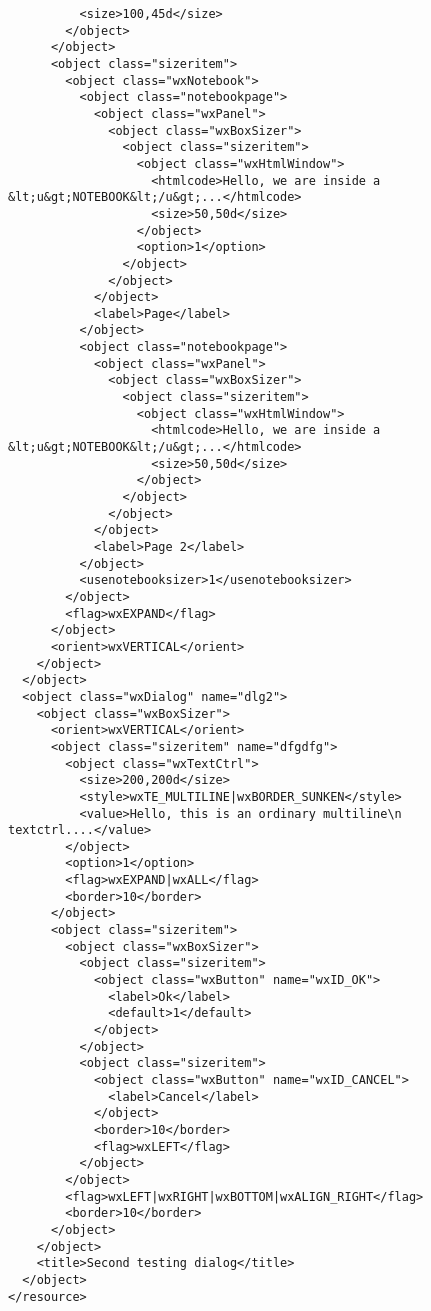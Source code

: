 \begin{verbatim}
          <size>100,45d</size>
        </object>
      </object>
      <object class="sizeritem">
        <object class="wxNotebook">
          <object class="notebookpage">
            <object class="wxPanel">
              <object class="wxBoxSizer">
                <object class="sizeritem">
                  <object class="wxHtmlWindow">
                    <htmlcode>Hello, we are inside a &lt;u&gt;NOTEBOOK&lt;/u&gt;...</htmlcode>
                    <size>50,50d</size>
                  </object>
                  <option>1</option>
                </object>
              </object>
            </object>
            <label>Page</label>
          </object>
          <object class="notebookpage">
            <object class="wxPanel">
              <object class="wxBoxSizer">
                <object class="sizeritem">
                  <object class="wxHtmlWindow">
                    <htmlcode>Hello, we are inside a &lt;u&gt;NOTEBOOK&lt;/u&gt;...</htmlcode>
                    <size>50,50d</size>
                  </object>
                </object>
              </object>
            </object>
            <label>Page 2</label>
          </object>
          <usenotebooksizer>1</usenotebooksizer>
        </object>
        <flag>wxEXPAND</flag>
      </object>
      <orient>wxVERTICAL</orient>
    </object>
  </object>
  <object class="wxDialog" name="dlg2">
    <object class="wxBoxSizer">
      <orient>wxVERTICAL</orient>
      <object class="sizeritem" name="dfgdfg">
        <object class="wxTextCtrl">
          <size>200,200d</size>
          <style>wxTE_MULTILINE|wxBORDER_SUNKEN</style>
          <value>Hello, this is an ordinary multiline\n         textctrl....</value>
        </object>
        <option>1</option>
        <flag>wxEXPAND|wxALL</flag>
        <border>10</border>
      </object>
      <object class="sizeritem">
        <object class="wxBoxSizer">
          <object class="sizeritem">
            <object class="wxButton" name="wxID_OK">
              <label>Ok</label>
              <default>1</default>
            </object>
          </object>
          <object class="sizeritem">
            <object class="wxButton" name="wxID_CANCEL">
              <label>Cancel</label>
            </object>
            <border>10</border>
            <flag>wxLEFT</flag>
          </object>
        </object>
        <flag>wxLEFT|wxRIGHT|wxBOTTOM|wxALIGN_RIGHT</flag>
        <border>10</border>
      </object>
    </object>
    <title>Second testing dialog</title>
  </object>
</resource>
\end{verbatim}

